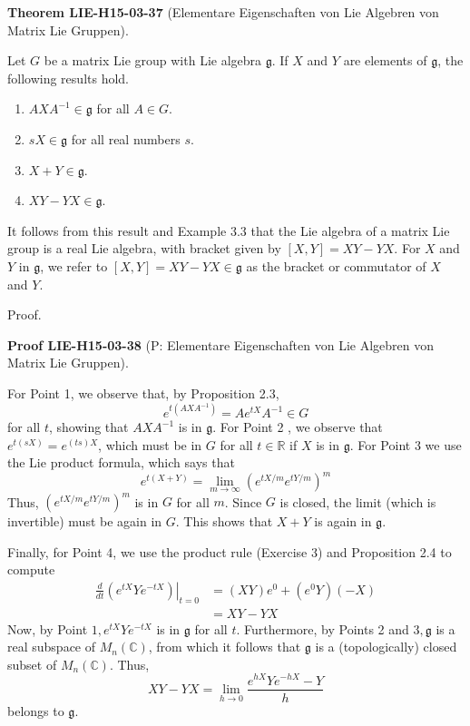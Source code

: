 \documentclass[10pt, letterpaper]{article}
\newcommand{\CustomHeading}[3]{%
  \par\medskip\noindent%
  \textbf{#1 #2} \textnormal{(#3)}.\enskip%
}
\newenvironment{THEO}[2]{\begin{unitbox}\CustomHeading{Theorem}{#1}{#2}}{\end{unitbox}}
\newenvironment{PROOF}[2]{\begin{unitbox}\CustomHeading{Proof}{#1}{#2}}{\end{unitbox}}
\begin{document}
\begin{THEO}{LIE-H15-03-37}{Elementare Eigenschaften von Lie Algebren von Matrix Lie Gruppen}
Let $G$ be a matrix Lie group with Lie algebra $\mathfrak{g}$. If $X$ and $Y$ are elements of $\mathfrak{g}$, the following results hold.
\begin{enumerate}
  \item $A X A^{-1} \in \mathfrak{g}$ for all $A \in G$.
  \item $s X \in \mathfrak{g}$ for all real numbers $s$.
  \item $X+Y \in \mathfrak{g}$.
  \item $X Y-Y X \in \mathfrak{g}$.
\end{enumerate}
It follows from this result and Example 3.3 that the Lie algebra of a matrix Lie group is a real Lie algebra, with bracket given by $[X, Y]=X Y-Y X$. For $X$ and $Y$ in $\mathfrak{g}$, we refer to $[X, Y]=X Y-Y X \in \mathfrak{g}$ as the bracket or commutator of $X$ and $Y$.
\end{THEO}

Proof. 

\begin{PROOF}{LIE-H15-03-38}{P: Elementare Eigenschaften von Lie Algebren von Matrix Lie Gruppen}
For Point 1, we observe that, by Proposition 2.3,
$$
e^{t\left(A X A^{-1}\right)}=A e^{t X} A^{-1} \in G
$$
for all $t$, showing that $A X A^{-1}$ is in $\mathfrak{g}$. For Point 2 , we observe that $e^{t(s X)}=e^{(t s) X}$, which must be in $G$ for all $t \in \mathbb{R}$ if $X$ is in $\mathfrak{g}$. For Point 3 we use the Lie product formula, which says that
$$
e^{t(X+Y)}=\lim _{m \rightarrow \infty}\left(e^{t X / m} e^{t Y / m}\right)^{m}
$$
Thus, $\left(e^{t X / m} e^{t Y / m}\right)^{m}$ is in $G$ for all $m$. Since $G$ is closed, the limit (which is invertible) must be again in $G$. This shows that $X+Y$ is again in $\mathfrak{g}$.

Finally, for Point 4, we use the product rule (Exercise 3) and Proposition 2.4 to compute
$$
\begin{aligned}
\left.\frac{d}{d t}\left(e^{t X} Y e^{-t X}\right)\right|_{t=0} & =(X Y) e^{0}+\left(e^{0} Y\right)(-X) \\
& =X Y-Y X
\end{aligned}
$$
Now, by Point $1, e^{t X} Y e^{-t X}$ is in $\mathfrak{g}$ for all $t$. Furthermore, by Points 2 and $3, \mathfrak{g}$ is a real subspace of $M_{n}(\mathbb{C})$, from which it follows that $\mathfrak{g}$ is a (topologically) closed subset of $M_{n}(\mathbb{C})$. Thus,
$$
X Y-Y X=\lim _{h \rightarrow 0} \frac{e^{h X} Y e^{-h X}-Y}{h}
$$
belongs to $\mathfrak{g}$.
\end{PROOF}
\end{document}
